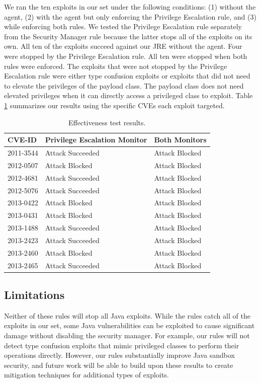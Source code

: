 \documentclass{sig-alternate}
\begin{document}
We ran the ten exploits in our set under the following conditions:
(1) without the agent, (2) with the agent but only enforcing the Privilege
Escalation rule, and (3) while enforcing both rules. We tested the Privilege Escalation rule separately from the Security Manager rule because the latter stops all of the exploits on its own. All
ten of the exploits succeed against our JRE without the agent. Four
were stopped by the Privilege Escalation rule. All ten were stopped
when both rules were enforced. The exploits that were not stopped
by the Privilege Escalation rule were either type confusion exploits
or exploits that did not need to elevate the privileges of the payload
class. The payload class does not need elevated privileges when it
can directly access a privileged class to exploit. Table \ref{tab:Exploit-experiment-summary}
summarizes our results using the specific CVEs each exploit targeted.

\begin{table}
\protect\caption{Effectiveness test results.}\label{tab:Exploit-experiment-summary}


\centering{}%
\begin{tabular}{l>{\raggedright}p{3cm}l}
\toprule 
\textbf{CVE-ID} & \textbf{Privilege Escalation Monitor} & \textbf{Both Monitors}\tabularnewline
\midrule
2011-3544 & Attack Succeeded  & Attack Blocked\tabularnewline
2012-0507 & Attack Blocked & Attack Blocked\tabularnewline
2012-4681 & Attack Succeeded  & Attack Blocked\tabularnewline
2012-5076 & Attack Succeeded  & Attack Blocked\tabularnewline
2013-0422 & Attack Blocked & Attack Blocked\tabularnewline
2013-0431 & Attack Blocked & Attack Blocked\tabularnewline
2013-1488 & Attack Succeeded  & Attack Blocked\tabularnewline
2013-2423 & Attack Succeeded  & Attack Blocked\tabularnewline
2013-2460 & Attack Blocked & Attack Blocked\tabularnewline
2013-2465 & Attack Succeeded  & Attack Blocked\tabularnewline
\bottomrule
\end{tabular}
\end{table}

\subsection{Limitations}

Neither of these rules will stop all Java exploits. While the rules
catch all of the exploits in our set, some Java vulnerabilities can
be exploited to cause significant damage without disabling the security
manager. For example, our rules will not detect type confusion exploits
that mimic privileged classes to perform their operations directly.
However, our rules substantially improve Java sandbox security, and
future work will be able to build upon these results to create mitigation
techniques for additional types of exploits.
\end{document}
